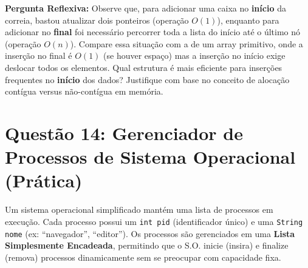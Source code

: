 \documentclass[12pt, a4paper]{article}
\begin{document}
\textbf{Pergunta Reflexiva:} Observe que, para adicionar uma caixa no \textbf{início} da correia, bastou atualizar dois ponteiros (operação $O(1)$), enquanto para adicionar no \textbf{final} foi necessário percorrer toda a lista do início até o último nó (operação $O(n)$). Compare essa situação com a de um array primitivo, onde a inserção no final é $O(1)$ (se houver espaço) mas a inserção no início exige deslocar todos os elementos. Qual estrutura é mais eficiente para inserções frequentes no \textbf{início} dos dados? Justifique com base no conceito de alocação contígua versus não-contígua em memória.

\vspace{0.2cm}

\section*{Questão 14: Gerenciador de Processos de Sistema Operacional (Prática)}
Um sistema operacional simplificado mantém uma lista de processos em execução. Cada processo possui um \texttt{int pid} (identificador único) e uma \texttt{String nome} (ex: ``navegador'', ``editor''). Os processos são gerenciados em uma \textbf{Lista Simplesmente Encadeada}, permitindo que o S.O. inicie (insira) e finalize (remova) processos dinamicamente sem se preocupar com capacidade fixa.
\end{document}
